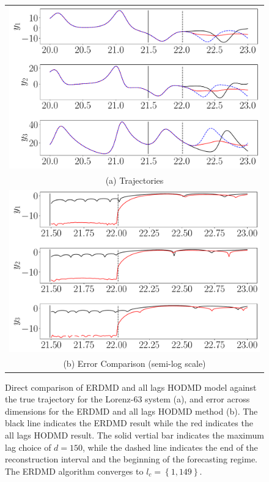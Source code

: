 \documentclass[a4paper,11pt]{article}
\begin{document}
\begin{figure}[!h]
\centering
\begin{tabular}{c}
\includegraphics[width=.8\textwidth]{Lorenz_compare_w_mx_lag_150}\\
(a) Trajectories\\
\includegraphics[width=.8\textwidth]{Lorenz_error_compare_w_mx_lag_150}\\
(b) Error Comparison (semi-log scale)
\end{tabular}
\caption{Direct comparison of ERDMD and all lags HODMD model against the true trajectory for the Lorenz-63 system (a), and error across dimensions for the ERDMD and all lags HODMD method (b).  The black line indicates the ERDMD result while the red indicates the all lags HODMD result.  The solid vertial bar indicates the maximum lag choice of $d=150$, while the dashed line indicates the end of the reconstruction interval and the beginning of the forecasting regime. The ERDMD algorithm converges to $l_{c}=\left\{1,149\right\}$.}
\label{fig:lorenz_compare_d_150}
\end{figure}
\end{document}
